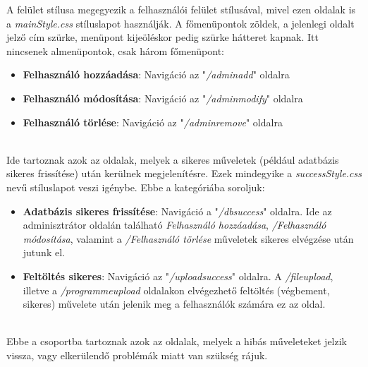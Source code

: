 A felület stílusa megegyezik a felhasználói felület stílusával, mivel ezen oldalak is a \textit{mainStyle.css} stíluslapot használják. A főmenüpontok zöldek, a jelenlegi oldalt jelző cím szürke, menüpont kijeöléskor pedig szürke hátteret kapnak. Itt nincsenek almenüpontok, csak három főmenüpont:

\begin{itemize}
\item{\textbf{Felhasználó hozzáadása}: Navigáció az "\textit{/adminadd}" oldalra}
\item{\textbf{Felhasználó módosítása}: Navigáció az "\textit{/adminmodify}" oldalra}
\item{\textbf{Felhasználó törlése}: Navigáció az "\textit{/adminremove}" oldalra}
\end{itemize}

\\

Ide tartoznak azok az oldalak, melyek a sikeres műveletek (például adatbázis sikeres frissítése) után kerülnek megjelenítésre. Ezek mindegyike a \textit{successStyle.css} nevű stíluslapot veszi igénybe. Ebbe a kategóriába soroljuk:

\begin{itemize}
\item{\textbf{Adatbázis sikeres frissítése}: Navigáció a "\textit{/dbsuccess}" oldalra. Ide az adminisztrátor oldalán található \textit{Felhasználó hozzáadása}, \textit{/Felhasználó módosítása}, valamint a \textit{/Felhasználó törlése} műveletek sikeres elvégzése után jutunk el.}
\item{\textbf{Feltöltés sikeres}: Navigáció az "\textit{/uploadsuccess}" oldalra. A \textit{/fileupload}, illetve a \textit{/programmeupload} oldalakon elvégezhető feltöltés (végbement, sikeres) művelete után jelenik meg a felhasználók számára ez az oldal.}
\end{itemize}

\\

Ebbe a csoportba tartoznak azok az oldalak, melyek a hibás műveleteket jelzik vissza, vagy elkerülendő problémák miatt van szükség rájuk.


